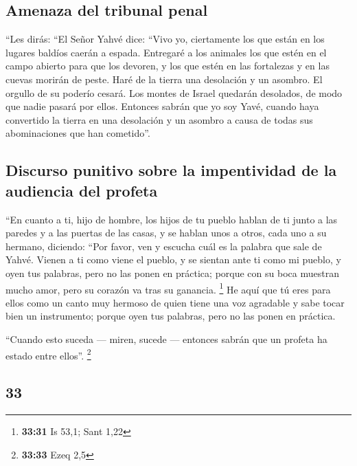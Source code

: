 \begin{paracol}{2}
\hypertarget{amenaza-del-tribunal-penal}{%
\subsection{Amenaza del tribunal
penal}\label{amenaza-del-tribunal-penal}}

 ``Les dirás: ``El Señor Yahvé dice: ``Vivo yo,
ciertamente los que están en los lugares baldíos caerán a espada.
Entregaré a los animales los que estén en el campo abierto para que los
devoren, y los que estén en las fortalezas y en las cuevas morirán de
peste.  Haré de la tierra una desolación y un asombro. El
orgullo de su poderío cesará. Los montes de Israel quedarán desolados,
de modo que nadie pasará por ellos.  Entonces sabrán que
yo soy Yavé, cuando haya convertido la tierra en una desolación y un
asombro a causa de todas sus abominaciones que han cometido''.

\hypertarget{discurso-punitivo-sobre-la-impentividad-de-la-audiencia-del-profeta}{%
\subsection{Discurso punitivo sobre la impentividad de la audiencia del
profeta}\label{discurso-punitivo-sobre-la-impentividad-de-la-audiencia-del-profeta}}

 ``En cuanto a ti, hijo de hombre, los hijos de tu pueblo
hablan de ti junto a las paredes y a las puertas de las casas, y se
hablan unos a otros, cada uno a su hermano, diciendo: ``Por favor, ven y
escucha cuál es la palabra que sale de Yahvé.  Vienen a
ti como viene el pueblo, y se sientan ante ti como mi pueblo, y oyen tus
palabras, pero no las ponen en práctica; porque con su boca muestran
mucho amor, pero su corazón va tras su ganancia. \footnote{\textbf{33:31}
  Is 53,1; Sant 1,22}  He aquí que tú eres para ellos
como un canto muy hermoso de quien tiene una voz agradable y sabe tocar
bien un instrumento; porque oyen tus palabras, pero no las ponen en
práctica.

 ``Cuando esto suceda --- miren, sucede --- entonces
sabrán que un profeta ha estado entre ellos''. \footnote{\textbf{33:33}
  Ezeq 2,5}

\switchcolumn
\begin{otherlanguage}{english}

\hypertarget{section-65}{%
\section{33}\label{section-65}}


\end{otherlanguage}
\end{paracol}
